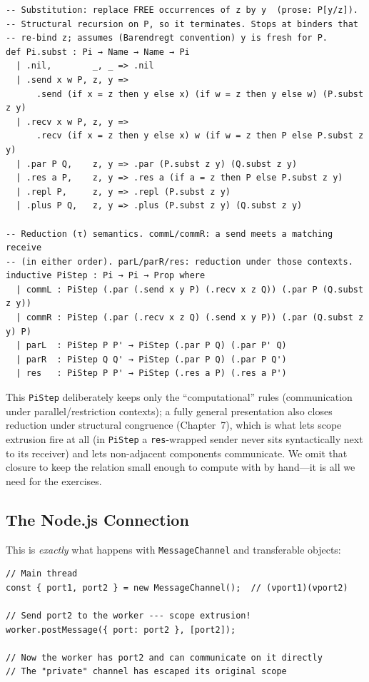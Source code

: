 \documentclass[11pt, a4paper, oneside]{book}
\newcommand{\lc}[1]{\texttt{#1}}
\newcounter{exercise}[chapter]
\begin{document}
\begin{leanbox}
\begin{verbatim}
-- Substitution: replace FREE occurrences of z by y  (prose: P[y/z]).
-- Structural recursion on P, so it terminates. Stops at binders that
-- re-bind z; assumes (Barendregt convention) y is fresh for P.
def Pi.subst : Pi → Name → Name → Pi
  | .nil,        _, _ => .nil
  | .send x w P, z, y =>
      .send (if x = z then y else x) (if w = z then y else w) (P.subst z y)
  | .recv x w P, z, y =>
      .recv (if x = z then y else x) w (if w = z then P else P.subst z y)
  | .par P Q,    z, y => .par (P.subst z y) (Q.subst z y)
  | .res a P,    z, y => .res a (if a = z then P else P.subst z y)
  | .repl P,     z, y => .repl (P.subst z y)
  | .plus P Q,   z, y => .plus (P.subst z y) (Q.subst z y)

-- Reduction (τ) semantics. commL/commR: a send meets a matching receive
-- (in either order). parL/parR/res: reduction under those contexts.
inductive PiStep : Pi → Pi → Prop where
  | commL : PiStep (.par (.send x y P) (.recv x z Q)) (.par P (Q.subst z y))
  | commR : PiStep (.par (.recv x z Q) (.send x y P)) (.par (Q.subst z y) P)
  | parL  : PiStep P P' → PiStep (.par P Q) (.par P' Q)
  | parR  : PiStep Q Q' → PiStep (.par P Q) (.par P Q')
  | res   : PiStep P P' → PiStep (.res a P) (.res a P')
\end{verbatim}
\end{leanbox}

This \lc{PiStep} deliberately keeps only the ``computational'' rules
(communication under parallel/restriction contexts); a fully general
presentation also closes reduction under structural congruence
(Chapter~7), which is what lets scope extrusion fire at all (in \lc{PiStep}
a \lc{res}-wrapped sender never sits syntactically next to its receiver) and
lets non-adjacent components communicate.
We omit that closure to keep the relation small enough to compute with by
hand---it is all we need for the exercises.

\subsection{The Node.js Connection}

This is \emph{exactly} what happens with \lc{MessageChannel} and transferable
objects:

\begin{tsbox}
\begin{verbatim}
// Main thread
const { port1, port2 } = new MessageChannel();  // (νport1)(νport2)

// Send port2 to the worker --- scope extrusion!
worker.postMessage({ port: port2 }, [port2]);

// Now the worker has port2 and can communicate on it directly
// The "private" channel has escaped its original scope
\end{verbatim}
\end{tsbox}
\end{document}

